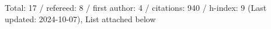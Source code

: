 Total: 17 / refereed: 8 / first author: 4 / citations: 940 / h-index: 9 (Last updated: 2024-10-07), List attached below